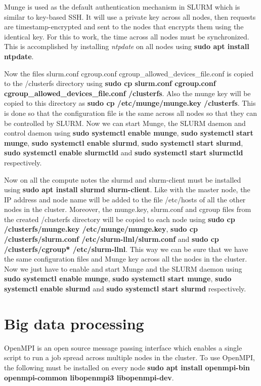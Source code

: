 \documentclass[../Head/Report.tex]{subfiles}
\begin{document}
Munge is used as the default authentication mechanism in SLURM which is similar to key-based SSH. It will use a private key across all nodes, then requests are timestamp-encrypted and sent to the nodes that encrypts them using the identical key. For this to work, the time across all nodes must be synchronized. This is accomplished by installing \textit{ntpdate} on all nodes using \textbf{sudo apt install ntpdate}. 

Now the files slurm.conf cgroup.conf cgroup\_allowed\_devices\_file.conf is copied to the /clusterfs directory using \textbf{sudo cp slurm.conf cgroup.conf cgroup\_allowed\_devices\_file.conf /clusterfs}. Also the munge key will be copied to this directory as \textbf{sudo cp /etc/munge/munge.key /clusterfs}. This is done so that the configuration file is the same across all nodes so that they can be controlled by SLURM. Now we can start Munge, the SLURM daemon and control daemon using \textbf{sudo systemctl enable munge}, \textbf{sudo systemctl start munge}, \textbf{sudo systemctl enable slurmd}, \textbf{sudo systemctl start slurmd}, \textbf{sudo systemctl enable slurmctld} and \textbf{sudo systemctl start slurmctld} respectively.

Now on all the compute notes the slurmd and slurm-client must be installed using \textbf{sudo apt install slurmd slurm-client}. Like with the master node, the IP address and node name will be added to the file /etc/hosts of all the other nodes in the cluster. Moreover, the munge.key, slurm.conf and cgroup files from the created /clusterfs directory will be copied to each node using \textbf{sudo cp /clusterfs/munge.key /etc/munge/munge.key}, \textbf{sudo cp /clusterfs/slurm.conf /etc/slurm-llnl/slurm.conf} and \textbf{sudo cp /clusterfs/cgroup* /etc/slurm-llnl}. This way we can be sure that we have the same configuration files and Munge key across all the nodes in the cluster. Now we just have to enable and start Munge and the SLURM daemon using \textbf{sudo systemctl enable munge}, \textbf{sudo systemctl start munge}, \textbf{sudo systemctl enable slurmd} and \textbf{sudo systemctl start slurmd} respectively.

\section{Big data processing}

OpenMPI is an open source message passing interface which enables a single script to run a job spread across multiple nodes in the cluster. To use OpenMPI, the following must be installed on every node \textbf{sudo apt install openmpi-bin openmpi-common libopenmpi3 libopenmpi-dev}.
\end{document}
